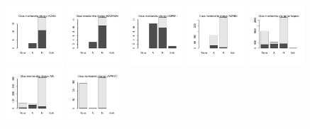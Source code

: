 \documentclass[utf8]{frontiersSCNS} %
\begin{document}
\begin{figure}[h!]
\includegraphics[width=0.19\textwidth]{figures/validation_plots/ache_0p8_valplot.pdf}
\includegraphics[width=0.19\textwidth]{figures/validation_plots/adora2a_0p8_valplot.pdf}
\includegraphics[width=0.19\textwidth]{figures/validation_plots/adrb1_0p8_valplot.pdf}
\includegraphics[width=0.19\textwidth]{figures/validation_plots/adrb2_0p8_valplot.pdf}
\includegraphics[width=0.19\textwidth]{figures/validation_plots/alltargets_0p8_valplot.pdf}
\includegraphics[width=0.19\textwidth]{figures/validation_plots/ar_0p8_valplot.pdf}
\includegraphics[width=0.19\textwidth]{figures/validation_plots/avpr1a_0p8_valplot.pdf}

\end{figure}
\end{document}
